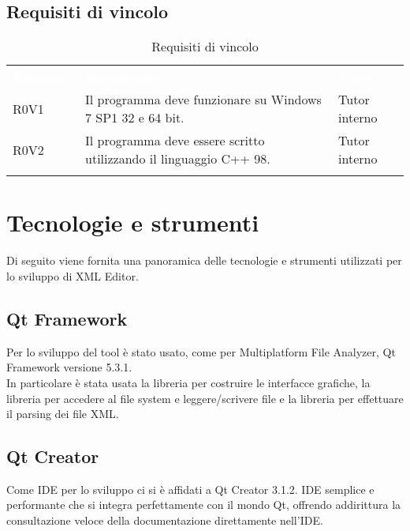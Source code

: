 \subsection{Requisiti di vincolo}
\begin{center}
	\begin{longtable}{p{4.2cm}!{\color{white}\vrule width 0.5mm}p{6cm}!{\color{white}\vrule width 0.5mm}p{2.5cm}!{\color{white}\vrule width 0.5mm}}
		\textcolor{white}{\textbf{Requisito}}&\textcolor{white}{\textbf{Descrizione}}&\textcolor{white}{\textbf{Fonti}}\\
		
		\hspace{0mm}\hypertarget{R0V1}{R0V1} & Il programma deve funzionare su Windows 7 SP1 32 e 64 bit. & Tutor interno\\
		
		\hspace{0mm}\hypertarget{R0V2}{R0V2} & Il programma deve essere scritto utilizzando il linguaggio C++ 98. & Tutor interno\\
		
		\hline
		\caption{Requisiti di vincolo}
	\end{longtable}
\end{center}

\section{Tecnologie e strumenti}
Di seguito viene fornita una panoramica delle tecnologie e strumenti utilizzati per lo sviluppo di XML Editor\textsl{}.

	\subsection{Qt Framework}
		Per lo sviluppo del tool è stato usato, come per Multiplatform File Analyzer, Qt Framework versione 5.3.1.\\
		In particolare è stata usata la libreria per costruire le interfacce grafiche, la libreria per accedere al file system e leggere/scrivere file e la libreria per effettuare il parsing dei file XML.
	
	\subsection{Qt Creator}
		Come IDE per lo sviluppo ci si è affidati a Qt Creator 3.1.2. IDE semplice e performante che si integra perfettamente con il mondo Qt, offrendo addirittura la consultazione veloce della documentazione direttamente nell'IDE.
	
